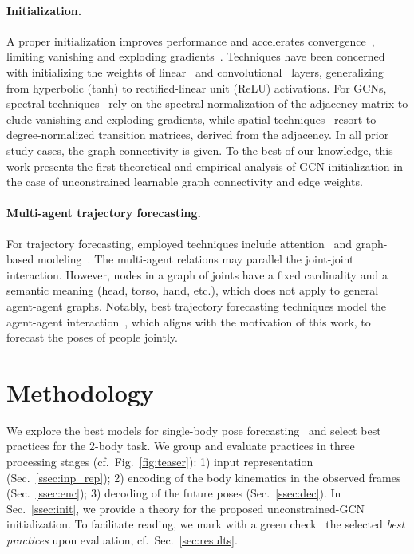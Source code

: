 \documentclass[10pt,twocolumn,letterpaper]{article}
\begin{document}
\paragraph{Initialization.}
A proper initialization improves performance and accelerates convergence~\cite{Krizhevsky12}, limiting vanishing and exploding gradients~\cite{glorot10,he15}.
Techniques have been concerned with initializing the weights of linear~\cite{glorot10} and convolutional~\cite{he15, Krhenbhl2016, Mishkin15} layers, generalizing from hyperbolic (tanh) to rectified-linear unit (ReLU) activations.
For GCNs, spectral techniques~\cite{kipf17,zhang2021magnet,li_2018_agcn} rely on the spectral normalization of the adjacency matrix to elude vanishing and exploding gradients, while spatial techniques~\cite{Atwood16} resort to degree-normalized transition matrices, derived from the adjacency.
In all prior study cases, the graph connectivity is given.
To the best of our knowledge, this work presents the first theoretical and empirical analysis of GCN initialization in the case of unconstrained learnable graph connectivity and edge weights.

\paragraph{Multi-agent trajectory forecasting.}
For trajectory forecasting, employed techniques include attention~\cite{yuan2021agent, Kothari22, Huang19} and graph-based modeling~\cite{Li2020EvolveGraphMT, Shi21, monti21dag}. The multi-agent relations may parallel the joint-joint interaction. However, nodes in a graph of joints have a fixed cardinality and a semantic meaning (head, torso, hand, etc.), which does not apply to general agent-agent graphs. 
Notably, best trajectory forecasting techniques model the agent-agent interaction~\cite{Li2020EvolveGraphMT,yuan2021agent,Shi21,Kothari22,Huang19,monti21dag}, which aligns with the motivation of this work, to forecast the poses of people jointly.

 
\section{Methodology}\label{sec:methodology}

We explore the best models for single-body pose forecasting~\cite{mao19ltd, mao20his, sofianos21, Dang21, guo2022back} and select best practices for the 2-body task.
We group and evaluate practices in three processing stages (cf.\ Fig.~\ref{fig:teaser}): 1) input representation (Sec.~\ref{ssec:inp_rep}); 2) encoding of the body kinematics in the observed frames (Sec.~\ref{ssec:enc}); 3) decoding of the future poses (Sec.~\ref{ssec:dec}). In Sec.~\ref{ssec:init}, we provide a theory for the proposed unconstrained-GCN initialization. To facilitate reading, we mark with a green check \greencheck\ the selected \emph{best practices} upon evaluation, cf.\ Sec.~\ref{sec:results}.
\end{document}
